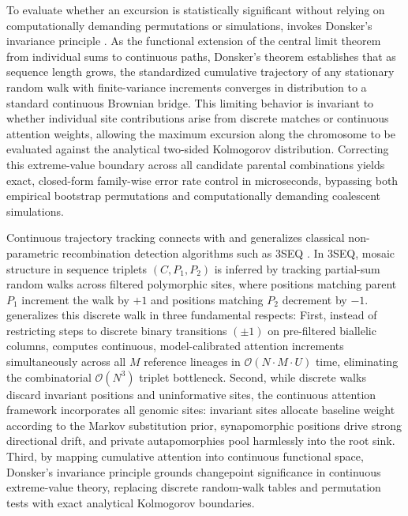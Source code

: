 To evaluate whether an excursion is statistically significant without relying on computationally demanding permutations or simulations, \RhizAeon invokes Donsker's invariance principle \citep{donsker1951invariance}.
As the functional extension of the central limit theorem from individual sums to continuous paths, Donsker's theorem establishes that as sequence length grows, the standardized cumulative trajectory of any stationary random walk with finite-variance increments converges in distribution to a standard continuous Brownian bridge.
This limiting behavior is invariant to whether individual site contributions arise from discrete matches or continuous attention weights, allowing the maximum excursion along the chromosome to be evaluated against the analytical two-sided Kolmogorov distribution.
Correcting this extreme-value boundary across all candidate parental combinations yields exact, closed-form family-wise error rate control in microseconds, bypassing both empirical bootstrap permutations and computationally demanding coalescent simulations.

Continuous trajectory tracking connects with and generalizes classical non-parametric recombination detection algorithms such as 3SEQ \citep{boni2007exact,lam20183seq}.
In 3SEQ, mosaic structure in sequence triplets $(C, P_1, P_2)$ is inferred by tracking partial-sum random walks across filtered polymorphic sites, where positions matching parent $P_1$ increment the walk by $+1$ and positions matching $P_2$ decrement by $-1$.
\RhizAeon generalizes this discrete walk in three fundamental respects:
First, instead of restricting steps to discrete binary transitions $(\pm 1)$ on pre-filtered biallelic columns, \RhizAeon computes continuous, model-calibrated attention increments simultaneously across all $M$ reference lineages in $\mathcal{O}(N \cdot M \cdot U)$ time, eliminating the combinatorial $\mathcal{O}(N^3)$ triplet bottleneck.
Second, while discrete walks discard invariant positions and uninformative sites, the continuous attention framework incorporates all genomic sites: invariant sites allocate baseline weight according to the Markov substitution prior, synapomorphic positions drive strong directional drift, and private autapomorphies pool harmlessly into the root sink.
Third, by mapping cumulative attention into continuous functional space, Donsker's invariance principle grounds changepoint significance in continuous extreme-value theory, replacing discrete random-walk tables and permutation tests with exact analytical Kolmogorov boundaries.

